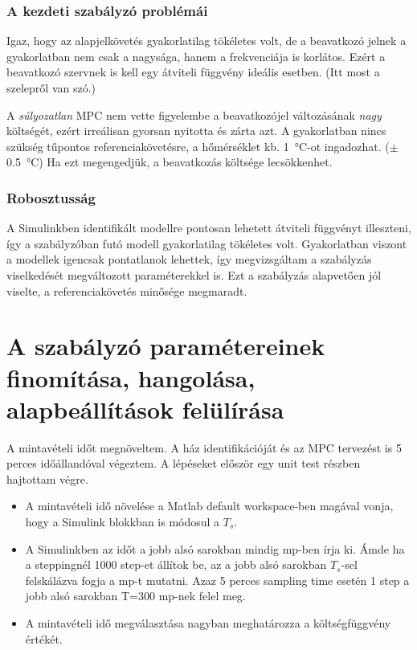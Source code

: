 \subsubsection{A kezdeti szabályzó problémái}
Igaz, hogy az alapjelkövetés gyakorlatilag tökéletes volt, de a beavatkozó jelnek a gyakorlatban nem csak a nagysága, hanem a frekvenciája is korlátos. Ezért a beavatkozó szervnek is kell egy átviteli függvény ideális esetben. (Itt most a szelepről van szó.)

A \textit{súlyozatlan} MPC nem vette figyelembe a beavatkozójel változásának \textit{nagy} költségét, ezért irreálisan gyorsan nyitotta és zárta azt.
A gyakorlatban nincs szükség tűpontos referenciakövetésre, a hőmérséklet kb. \SI{1}{\celsius}-ot ingadozhat. ($\pm$ \SI{0.5}{\celsius}) Ha ezt megengedjük, a beavatkozás költsége lecsökkenhet.

\subsubsection{Robosztusság}

A Simulinkben identifikált modellre pontosan lehetett átviteli függvényt illeszteni, így a szabályzóban futó modell gyakorlatilag tökéletes volt. Gyakorlatban viszont a modellek igencsak pontatlanok lehettek, így megvizsgáltam a szabályzás viselkedését megváltozott paraméterekkel is. Ezt a szabályzás alapvetően jól viselte, a referenciakövetés minősége megmaradt.

\section{A szabályzó paramétereinek finomítása, hangolása, alapbeállítások felülírása}

A mintavételi időt megnöveltem. A ház identifikációját és az MPC tervezést is 5 perces időállandóval végeztem. A lépéseket először egy unit test részben hajtottam végre.

\begin{itemize}[noitemsep,topsep=-8pt,parsep=0pt,partopsep=0pt]
	\item A mintavételi idő növelése a Matlab default workspace-ben magával vonja, hogy a Simulink blokkban is módosul a $T_s$. 
	\item A Simulinkben az időt a jobb alsó sarokban mindig mp-ben írja ki. Ámde ha a steppingnél 1000 step-et állítok be, az a jobb alsó sarokban $T_s$-sel felskálázva fogja a mp-t mutatni. Azaz 5 perces sampling time esetén 1 step a jobb alsó sarokban T=300 mp-nek felel meg.
	\item A mintavételi idő megválasztása nagyban meghatározza a költségfüggvény értékét.
\end{itemize}



